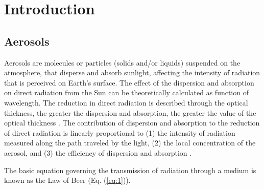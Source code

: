 \documentclass[12pt,letterpaper]{article}
\numberwithin{figure}{section}
\numberwithin{equation}{section}
\numberwithin{table}{section}
\begin{document}
\renewcommand{\sectionmark}[1]{\markright{\thesection.\ #1}}
\renewcommand{\headrulewidth}{0.5pt}


\onehalfspace
\tableofcontents



\newpage
{}
\setcounter{page}{1}
\renewcommand{\headrulewidth}{0.5pt}
\fancyfoot[R]{\small \rm \textit{\thepage  }}
\renewcommand{\footrulewidth}{0.pt}




\section{Introduction}



\subsection{Aerosols}

Aerosols are molecules or particles (solids and/or liquids) suspended on the atmosphere, that disperse and absorb sunlight, affecting the intensity of radiation that is perceived on Earth's surface. The effect of the dispersion and absorption on direct radiation from the Sun can be theoretically calculated as function of wavelength. The reduction in direct radiation is described through the optical thickness, the greater the dispersion and absorption, the greater the value of the optical thickness \cite{Brooks}. The contribution of dispersion and absorption to the reduction of direct radiation is linearly proportional to (1) the intensity of radiation measured along the path traveled by the light, (2) the local concentration of the aerosol, and (3) the efficiency of dispersion and absorption \cite{wallace2008}.

The basic equation governing the transmission of radiation through a medium is known as the Law of Beer (Eq. (\ref{eq:1})).
\end{document}

